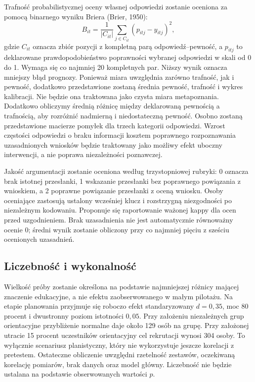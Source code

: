 \documentclass[11pt,a4paper]{article}
\begin{document}
Trafność probabilistycznej oceny własnej odpowiedzi zostanie oceniona za pomocą binarnego wyniku Briera (Brier, 1950):
\[
B_{it}=\frac{1}{|C_{it}|}\sum_{j\in C_{it}}(p_{itj}-y_{itj})^2,
\]
gdzie \(C_{it}\) oznacza zbiór pozycji z kompletną parą odpowiedź--pewność, a \(p_{itj}\) to deklarowane prawdopodobieństwo poprawności wybranej odpowiedzi w skali od 0 do 1. Wymaga się co najmniej 20 kompletnych par. Niższy wynik oznacza mniejszy błąd prognozy. Ponieważ miara uwzględnia zarówno trafność, jak i pewność, dodatkowo przedstawione zostaną średnia pewność, trafność i wykres kalibracji. Nie będzie ona traktowana jako czysta miara metapoznania. Dodatkowo obliczymy średnią różnicę między deklarowaną pewnością a trafnością, aby rozróżnić nadmierną i niedostateczną pewność. Osobno zostaną przedstawione macierze pomyłek dla trzech kategorii odpowiedzi. Wzrost częstości odpowiedzi o braku informacji kosztem poprawnego rozpoznawania uzasadnionych wniosków będzie traktowany jako możliwy efekt uboczny interwencji, a nie poprawa niezależności poznawczej.

Jakość argumentacji zostanie oceniona według trzystopniowej rubryki: 0 oznacza brak istotnej przesłanki, 1 wskazanie przesłanki bez poprawnego powiązania z wnioskiem, a 2 poprawne powiązanie przesłanki z oceną wniosku. Osoby oceniające zastosują ustalony wcześniej klucz i rozstrzygną niezgodności po niezależnym kodowaniu. Proponuje się raportowanie ważonej kappy dla ocen przed uzgodnieniem. Brak uzasadnienia nie jest automatycznie równoważny ocenie 0; średni wynik zostanie obliczony przy co najmniej pięciu z sześciu ocenionych uzasadnień.

\subsection{Liczebność i wykonalność}
Wielkość próby zostanie określona na podstawie najmniejszej różnicy mającej znaczenie edukacyjne, a nie efektu zaobserwowanego w małym pilotażu. Na etapie planowania przyjmuje się roboczo efekt standaryzowany \(d=0{,}35\), moc 80 procent i dwustronny poziom istotności \(0{,}05\). Przy założeniu niezależnych grup orientacyjne przybliżenie normalne daje około 129 osób na grupę. Przy założonej utracie 15 procent uczestników orientacyjny cel rekrutacji wynosi 304 osoby. To wyłącznie scenariusz planistyczny, który nie wykorzystuje jeszcze korelacji z pretestem. Ostateczne obliczenie uwzględni rzetelność zestawów, oczekiwaną korelację pomiarów, brak danych oraz model główny. Liczebność nie będzie ustalana na podstawie obserwowanych wartości \(p\).
\end{document}
